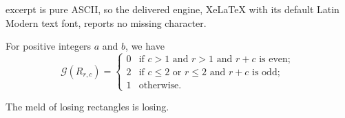 \documentclass[10pt,a4paper]{amsart}
\newcommand{\sg}{\mathcal{G}}
\begin{document}
excerpt is pure ASCII, so the delivered engine, XeLaTeX with its default Latin Modern text font, reports no missing character.
\begin{proposition}
\label{lem:rectangle}
For positive integers $a$ and $b$, we have
$$\sg(R_{r,c}) = 
\begin{cases}
0 & \text{if } c > 1 \text{ and } r > 1 \text{ and } r+c \text{ is even; }\\
2 & \text{if } c \leq 2 \text{ or } r \leq 2 \text{ and } r+c \text{ is odd; } \\
1 & \text{otherwise.}
\end{cases}$$
\end{proposition}

\begin{theorem} \label{thm:ltrl}
    The meld of losing rectangles is losing.
\end{theorem}
\end{document}
